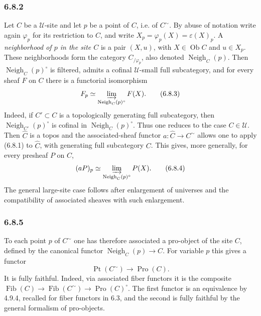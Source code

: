 \documentclass[11pt]{article}
\newcommand{\U}{\mathcal{U}}
\newcommand{\Ob}{\operatorname{Ob}}
\newcommand{\Ppoint}{\operatorname{Pt}}
\newcommand{\Ffib}{\operatorname{Fib}}
\newcommand{\Vvois}{\operatorname{Neigh}}
\begin{document}
\subsubsection*{6.8.2}
Let \(C\) be a \(\U\)-site and let \(p\) be a point of \(C\), i.e. of \(C^{\sim}\). By abuse of notation write again \(\varphi_p\) for its restriction to \(C\), and write \(X_p=\varphi_p(X)=\varepsilon(X)_p\). A \emph{neighborhood of \(p\) in the site \(C\)} is a pair \((X,u)\), with \(X\in\Ob C\) and \(u\in X_p\). These neighborhoods form the category \(C_{/\varphi_p}\), also denoted \(\Vvois_C(p)\). Then \(\Vvois_C(p)^\circ\) is filtered, admits a cofinal \(\U\)-small full subcategory, and for every sheaf \(F\) on \(C\) there is a functorial isomorphism
\begin{equation*}
F_p\simeq\varinjlim_{\Vvois_C(p)^\circ}F(X).\tag{6.8.3}
\end{equation*}
Indeed, if \(C'\subset C\) is a topologically generating full subcategory, then \(\Vvois_{C'}(p)^\circ\) is cofinal in \(\Vvois_C(p)^\circ\). Thus one reduces to the case \(C\in\U\). Then \(\widehat C\) is a topos and the associated-sheaf functor \(a:\widehat C\to C^{\sim}\) allows one to apply (6.8.1) to \(\widehat C\), with generating full subcategory \(C\). This gives, more generally, for every presheaf \(P\) on \(C\),
\begin{equation*}
(aP)_p\simeq\varinjlim_{\Vvois_C(p)^\circ}P(X).\tag{6.8.4}
\end{equation*}
The general large-site case follows after enlargement of universes and the compatibility of associated sheaves with such enlargement.

\subsubsection*{6.8.5}
To each point \(p\) of \(C^{\sim}\) one has therefore associated a pro-object of the site \(C\), defined by the canonical functor \(\Vvois_C(p)\to C\). For variable \(p\) this gives a functor
\begin{equation*}
\Ppoint(C^{\sim})\longrightarrow\operatorname{Pro}(C).\tag{6.8.5.1}
\end{equation*}
It is fully faithful. Indeed, via associated fiber functors it is the composite \(\Ffib(C)\to\Ffib(C^{\sim})\to\operatorname{Pro}(C)^\circ\). The first functor is an equivalence by 4.9.4, recalled for fiber functors in 6.3, and the second is fully faithful by the general formalism of pro-objects.
\end{document}
